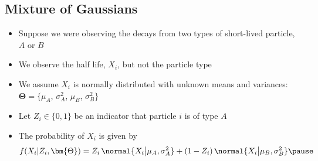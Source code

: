 \Outline %

\begin{slide}
\section{Mixture of Gaussians}

\begin{PauseHighLight}
  \begin{itemize}
  \item Suppose we were observing the decays from two types of
    short-lived particle, $A$ or $B$\pause
  \item We observe the half life, $X_i$, but not the particle type\pause
  \item We assume $X_i$ is normally distributed with unknown means and
    variances: $\bm{\Theta} = \{\mu_A$, $\sigma_A^2$, $\mu_B$,
    $\sigma_B^2\}$\pause
  \item Let $Z_i\in\{0,1\}$ be an indicator that particle $i$ is of
    type $A$\pause
  \item The probability of $X_i$ is given by
    \begin{align*}
      f(X_i|Z_i,\bm{\Theta}) = Z_i\,\normal{X_i\big|\mu_A,\sigma_A^2} +
      (1-Z_i)\,\normal{X_i\big|\mu_B,\sigma_B^2}\pause
    \end{align*}
  \end{itemize}
\end{PauseHighLight}

\end{slide}


